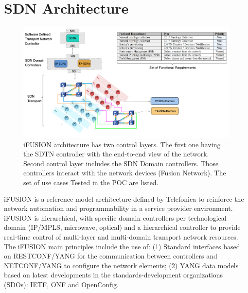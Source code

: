 \documentclass[10pt, conference]{IEEEtran}
\begin{document}
\section{SDN Architecture}
\label{section:arq}
\begin{figure}[htp]
	\centering
		\includegraphics[width=\linewidth]{figs/diagram-1.png}
	\caption{i\uppercase{FUSION}\cite{contreras2019ifusion} architecture has two control layers. The first one having the SDTN controller with the end-to-end view of the network. Second control layer includes the SDN Domain controllers. Those controllers interact with the network devices (Fusion Network). The set of use cases Tested in the POC are listed.}
	\label{FIG:1}
\end{figure}


i\uppercase{FUSION} is a reference model architecture defined by Telefonica to reinforce the network automation and programmability in a service provider environment. i\uppercase{FUSION} is hierarchical, with specific domain controllers per technological domain (IP/MPLS, microwave, optical)
and a hierarchical controller to provide real-time control of multi-layer and multi-domain transport network resources. The i\uppercase{FUSION} main principles include the use of: (1) Standard interfaces based on \uppercase{RESTconf/YANG} \cite{bierman2017restconf} for the communication between controllers and \uppercase{NETCONF/YANG} \cite{enns2011network} to configure the network elements; (2) YANG data models based on latest developments in the standards-development organizations (SDOs): \uppercase{IETF}, \uppercase{ONF} and OpenConfig.
\end{document}
